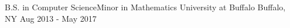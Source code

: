 

\begin{cventries}

  \cventry
    {B.S. in Computer Science{\enskip\cdotp\enskip}Minor in Mathematics} %
    {University at Buffalo} %
    {Buffalo, NY} %
    {Aug 2013 - May 2017} %
    {
    }



\end{cventries}
